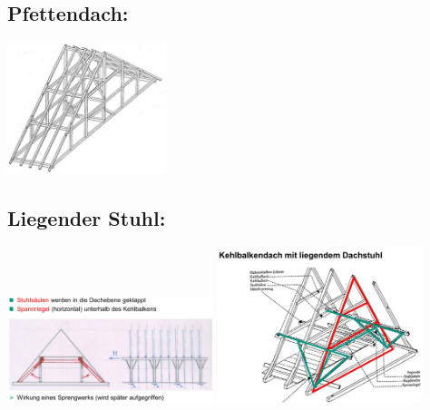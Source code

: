 \documentclass[fleqn,twoside]{article}
\begin{document}
    \subsection{Pfettendach:}
            \includegraphics[width=0.35\textwidth]{Grafiken/Daecher/Pfettendach.png}
    \subsection{Liegender Stuhl:}
            \includegraphics[width=0.45\textwidth]{Grafiken/Daecher/Funktionsweise Sprengwerk.jpg}
            \includegraphics[width=0.45\textwidth]{Grafiken/Daecher/Liegender Stuhl Kehlbalkendach.jpg}
\end{document}
